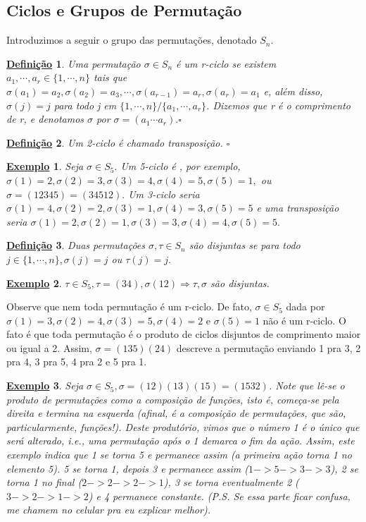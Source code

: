 \documentclass{article}
\newtheorem*{def*}{\underline{Defini\c c\~ao}}
\newtheorem{example*}{\underline{Exemplo}}
\begin{document}
\subsection{Ciclos e Grupos de Permuta\c c\~ao}
Introduzimos a seguir o grupo das permuta\c c\~oes, denotado $S_{n}.$
\begin{def*}
  Uma permuta\c c\~ao $\sigma\in S_{n}$ \'e um r-ciclo se existem $a_{1},\cdots, a_{r}\in\{1,\cdots, n\}$ tais que $\sigma(a_{1})=a_{2},
  \sigma(a_{2})=a_{3}, \cdots, \sigma(a_{r-1})=a_{r}, \sigma(a_{r}) = a_{1}$ e, al\'em disso, $\sigma(j) = j$ para todo j em $\{1,\cdots, n\}/\{a_{1},\cdots,a_{r}\}$. 
  Dizemos que r \'e o comprimento de r, e denotamos $\sigma$ por $\sigma=(a_{1}\cdots a_{r}).\square$
\end{def*}
\begin{def*}
  Um 2-ciclo \'e chamado transposi\c c\~ao. $\square$
\end{def*}
 \begin{example*}
   Seja $\sigma\in S_{5}.$ Um 5-ciclo \'e , por exemplo, $\sigma(1)=2, \sigma(2)=3, \sigma(3)=4, \sigma(4)=5, \sigma(5)=1,$ ou $\sigma=(12345)=(34512).$
Um 3-ciclo seria $\sigma(1)=4, \sigma(2)=2, \sigma(3)=1, \sigma(4)=3, \sigma(5)=5$ e uma transposi\c c\~ao seria $\sigma(1)=2, \sigma(2)=1, \sigma(3)=3, \sigma(4)=4, \sigma(5)=5.$
 \end{example*}
\begin{def*}
  Duas permuta\c c\~oes $\sigma, \tau\in S_{n}$ s\~ao disjuntas se para todo $j\in\{1, \cdots, n\}, \sigma(j) = j$ ou $\tau(j) = j.$
\end{def*}
\begin{example*}
  $\tau\in S_{5}, \tau=(34), \sigma(12) \Rightarrow \tau, \sigma$ s\~ao disjuntas.
\end{example*}
  Observe que nem toda permuta\c c\~ao \'e um r-ciclo. De fato, $\sigma\in S_{5}$ dada por $\sigma(1)=3, \sigma(2) = 4, \sigma(3) = 5, \sigma(4) = 2$
e $\sigma(5)=1$ n\~ao \'e um r-ciclo. O fato \'e que toda permuta\c c\~ao \'e o produto de ciclos disjuntos de comprimento maior ou igual a 2.
Assim, $\sigma = (135)(24)$ descreve a permuta\c c\~ao enviando 1 pra 3, 2 pra 4, 3 pra 5, 4 pra 2 e 5 pra 1. 
\begin{example*}
  Seja $\sigma\in S_{5}, \sigma=(12)(13)(15) = (1532)$. Note que l\^e-se o produto de permuta\c c\~oes como a composi\c c\~ao de fun\c c\~oes, isto \'e,
come\c ca-se pela direita e termina na esquerda (afinal, \'e a composi\c c\~ao de permuta\c c\~oes, que s\~ao, particularmente, fun\c c\~oes!). Deste produt\'orio, vimos que o n\'umero 1 \'e o \'unico que ser\'a alterado, i.e., uma permuta\c c\~ao ap\'os o 1 demarca o fim da a\c c\~ao. Assim, este
exemplo indica que 1 se torna 5 e permanece assim (a primeira a\c c\~ao torna 1 no elemento 5). 5 se torna 1, depois 3 e permanece assim ($1->5->3->3$), 2 se torna 1
no final ($2->2->2->1$), 3 se torna eventualmente 2 ($3->2->1->2$) e 4 permanece constante. (P.S. Se essa parte ficar confusa, me chamem no celular pra eu explicar melhor).
\end{example*}
\end{document}
